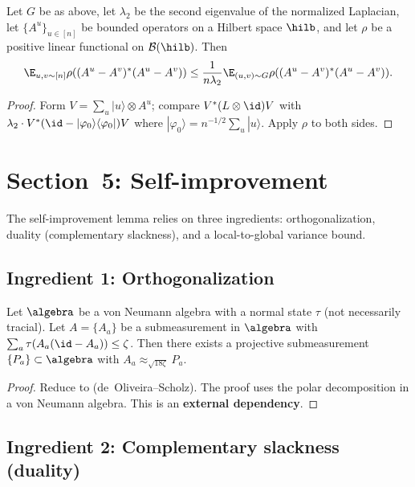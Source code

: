 \begin{lemma}\label{lem:local-to-global-expander}
  Let $G$ be as above, let $\lambda_2$ be the second eigenvalue of the
  normalized Laplacian, let $\{A^u\}_{u\in[n]}$ be bounded operators on a
  Hilbert space $\hilb$, and let $\rho$ be a positive linear functional on
  $\mathcal{B}(\hilb)$. Then
  \[
    \E_{u,v\sim[n]}\rho((A^u-A^v)^*(A^u-A^v))
    \le
    \frac{1}{n\lambda_2}
    \E_{(u,v)\sim G}\rho((A^u-A^v)^*(A^u-A^v)).
  \]
\end{lemma}
\begin{proof}
  Form $V=\sum_u|u\rangle\otimes A^u$; compare $V^*(L\otimes\id)V$
  with $\lambda_2\cdot V^*(\id-|\varphi_0\rangle\langle\varphi_0|)V$
  where $|\varphi_0\rangle=n^{-1/2}\sum_u|u\rangle$.
  Apply $\rho$ to both sides.
\end{proof}


\chapter{Section~5: Self-improvement}
\label{chap:self-improvement}

The self-improvement lemma relies on three ingredients: orthogonalization,
duality (complementary slackness), and a local-to-global variance bound.

\section{Ingredient 1: Orthogonalization}

\begin{lemma}[Orthogonalization]\label{lem:projectivization}
  Let $\algebra$ be a von Neumann algebra with a normal state $\tau$ (not
  necessarily tracial). Let $A=\{A_a\}$ be a submeasurement in $\algebra$
  with $\sum_a\tau(A_a(\id-A_a))\le\zeta$. Then there exists a projective
  submeasurement $\{P_a\}\subset\algebra$ with
  $A_a\approx_{\sqrt{18\zeta}}P_a$.
\end{lemma}
\begin{proof}
  Reduce to \cite[Theorem~1.2]{de2021orthogonalization} (de~Oliveira--Scholz).
  The proof uses the polar decomposition in a von Neumann algebra.
  This is an \textbf{external dependency}.
\end{proof}

\section{Ingredient 2: Complementary slackness (duality)}

